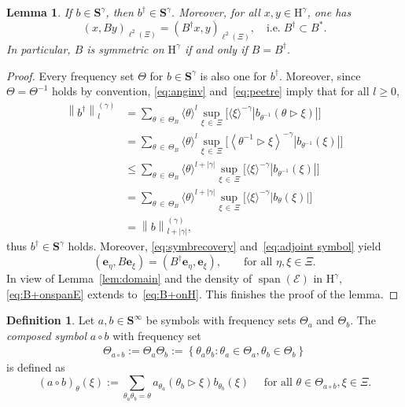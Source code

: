 \documentclass[10pt]{amsart}
\newtheorem{lemm}[theo]{Lemma}\newtheorem{prop}[theo]{Proposition}\newtheorem{coro}[theo]{Corollary}\newtheorem{conj}[theo]{Conjecture}
\theoremstyle{definition}\newtheorem{defi}[theo]{Definition}\newtheorem{rema}[theo]{Remark}\newtheorem{exam}[theo]{Example}\newtheorem{nota}[theo]{Notation}
\DeclareMathOperator{\spann}{span}
\renewcommand{\mathsf}{\mathrm}
\newcommand{\sfH}{\mathsf{H}}
\newcommand{\CE}{\mathcal{E}}
\newcommand{\BS}{\mathbf S}
\newcommand{\be}{\mathbf e}
\newcommand{\act}{\triangleright}
\renewcommand{\subseteq}{\subset}
\newcommand{\set}[1]{\left\{ #1 \right\}}
\newcommand{\snorm}[3]{\left\| #1\right\|_{#3}^{(#2)}}
\newcommand{\ang}[1]{\langle #1 \rangle}
\begin{document}
\begin{lemm} \label{lem:adjoint}
If $b\in\BS^\gamma$, then $b^\dagger\in\BS^\gamma$. Moreover, for all $x,y\in\sfH^\gamma$, one has
\begin{equation}\label{eq:B+onH}
(x,By)_{\ell^2(\Xi)}=\left(B^\dagger x,y\right)_{\ell^2(\Xi)}, \quad \text{i.e.}\; B^\dagger\subseteq B^*.
\end{equation}
In particular, $B$ is symmetric on $\sfH^\gamma$ if and only if $B=B^\dagger$.
\end{lemm}

\begin{proof}
Every frequency set $\Theta$ for $b\in\BS^\gamma$ is also one for $b^\dagger$. Moreover, since $\Theta=\Theta^{-1}$ holds by convention, \eqref{eq:anginv} and~\eqref{eq:peetre} imply that for all $l\geq 0$,
\begin{equation*}
\begin{aligned}
\snorm{b^\dagger}{\gamma}{l}&=\sum\limits_{\theta\,\in\,\Theta_B} \ang{\theta}^l\sup\limits_{\xi\,\in\,\Xi}\big[\ang{\xi}^{-\gamma}|b_{\theta^{-1}}(\theta\act\xi)|\big]\\
&=\sum\limits_{\theta\,\in\,\Theta_B}\ang{\theta}^l\sup\limits_{\xi\,\in\,\Xi}\big[\left\langle\theta^{-1}\act\xi\right\rangle^{-\gamma}|b_{\theta^{-1}}(\xi)|\big]\\
&\leq \sum\limits_{\theta\,\in\,\Theta_B}\ang{\theta}^{l+|\gamma|}\sup\limits_{\xi\,\in\,\Xi}\big[\ang{\xi}^{-\gamma}|b_{\theta^{-1}}(\xi)|\big]\\
&=\sum\limits_{\theta\,\in\,\Theta_B}\ang{\theta}^{l+|\gamma|}\sup\limits_{\xi\,\in\,\Xi}\big[\ang{\xi}^{-\gamma}|b_{\theta}(\xi)|\big]\\
&=\snorm{b}{\gamma}{l+|\gamma|},
\end{aligned}
\end{equation*}
thus $b^\dagger\in\BS^\gamma$ holds. Moreover, \eqref{eq:symbrecovery} and~\eqref{eq:adjoint symbol} yield
\begin{equation}\label{eq:B+onspanE}
(\be_\eta,B\be_\xi)=\left(B^\dagger\be_\eta,\be_\xi\right), \qquad \text{for all }\eta,\xi\in\Xi.
\end{equation}
In view of Lemma~\ref{lem:domain} and the density of $\spann(\CE)$ in $\sfH^\gamma$, \eqref{eq:B+onspanE} extends to~\eqref{eq:B+onH}. This finishes the proof of the lemma.
\end{proof}

\begin{defi}
Let $a, b \in \BS^\infty$ be symbols with frequency sets $\Theta_a$ and $\Theta_b$. The \emph{composed symbol} $a \circ b$ with frequency set
\begin{align}\label{eq:frequencysetcomposition}
\Theta_{a\circ b}:=\Theta_a \Theta_b := \set{\theta_a \theta_b :
\theta_a \in \Theta_a, \theta_b \in \Theta_b}
\end{align}
is defined as
\begin{equation}\label{eq:symbolcomposition}
(a \circ b)_\theta(\xi) := \sum_{\theta_a \theta_b = \theta} a_{\theta_a}(\theta_b \act\xi) b_{\theta_b}(\xi) \quad\text{ for all }\theta\in\Theta_{a\circ b}, \xi\in\Xi.
\end{equation}
\end{defi}
\end{document}
